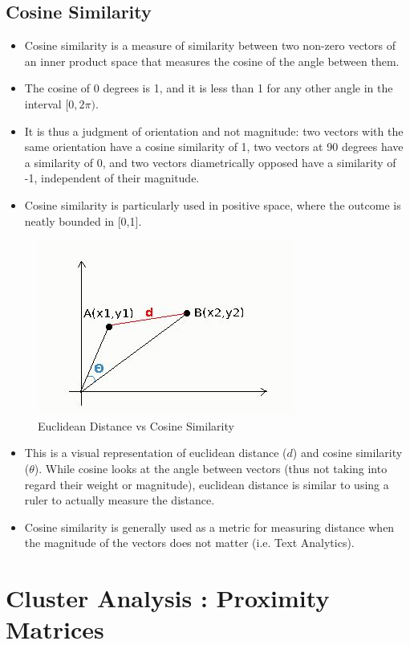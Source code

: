 \documentclass[a4paper,12pt]{article}
\begin{document}
\subsection*{Cosine Similarity}
\begin{itemize}
	\item Cosine similarity is a measure of similarity between two non-zero vectors of an inner product space that measures the cosine of the angle between them. 
	\item The cosine of 0 degrees is 1, and it is less than 1 for any other angle in the interval $[0,2\pi)$. \item It is thus a judgment of orientation and not magnitude: two vectors with the same orientation have a cosine similarity of 1, two vectors at 90 degrees have a similarity of 0, and two vectors diametrically opposed have a similarity of -1, independent of their magnitude. 
	\item Cosine similarity is particularly used in positive space, where the outcome is neatly bounded in [0,1].
	
\end{itemize}
\newpage \begin{figure}[h!]
 	\centering
 	\includegraphics[width=0.55\linewidth]{images/cosinesimilarity}
 	\caption{Euclidean Distance vs Cosine Similarity}
 	\label{fig:cosinesimilarity}
 \end{figure}
\begin{itemize}
	\item This is a visual representation of euclidean distance ($d$) and cosine similarity ($\theta$). While cosine looks at the angle between vectors (thus not taking into regard their weight or magnitude), euclidean distance is similar to using a ruler to actually measure the distance.
	\item Cosine similarity is generally used as a metric for measuring distance when the magnitude of the vectors does not matter (i.e. Text Analytics). 
\end{itemize} 
\newpage
\section*{Cluster Analysis : Proximity Matrices}
\end{document}
